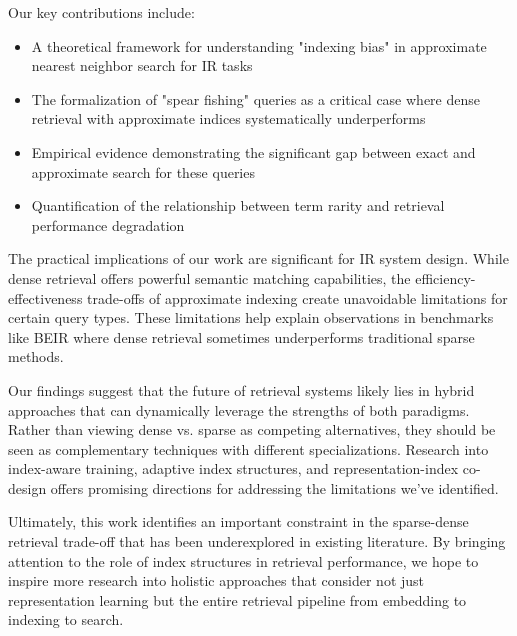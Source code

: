 \documentclass[sigconf,review]{acmart}
\begin{document}
Our key contributions include:

\begin{itemize}
\item A theoretical framework for understanding "indexing bias" in approximate nearest neighbor search for IR tasks
\item The formalization of "spear fishing" queries as a critical case where dense retrieval with approximate indices systematically underperforms
\item Empirical evidence demonstrating the significant gap between exact and approximate search for these queries
\item Quantification of the relationship between term rarity and retrieval performance degradation
\end{itemize}

The practical implications of our work are significant for IR system design. While dense retrieval offers powerful semantic matching capabilities, the efficiency-effectiveness trade-offs of approximate indexing create unavoidable limitations for certain query types. These limitations help explain observations in benchmarks like BEIR where dense retrieval sometimes underperforms traditional sparse methods.

Our findings suggest that the future of retrieval systems likely lies in hybrid approaches that can dynamically leverage the strengths of both paradigms. Rather than viewing dense vs. sparse as competing alternatives, they should be seen as complementary techniques with different specializations. Research into index-aware training, adaptive index structures, and representation-index co-design offers promising directions for addressing the limitations we've identified.

Ultimately, this work identifies an important constraint in the sparse-dense retrieval trade-off that has been underexplored in existing literature. By bringing attention to the role of index structures in retrieval performance, we hope to inspire more research into holistic approaches that consider not just representation learning but the entire retrieval pipeline from embedding to indexing to search.



\end{document}
